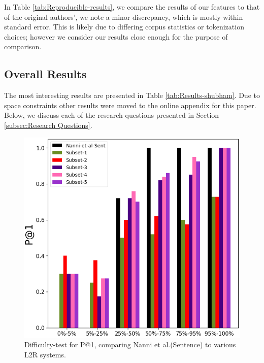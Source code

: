 In Table \ref{tab:Reproducible-results}, we compare the results of our features to that of the original authors', we note a minor discrepancy, which is mostly within standard error. This is likely due to differing corpus statistics or tokenization choices; however we consider our results close enough for the purpose of comparison. 


\subsection{Overall Results}
\label{subsec:Results}
The most interesting results are presented in Table \ref{tab:Results-shubham}. Due to space constraints other results were moved to the online appendix for this paper. Below, we discuss each of the research questions presented in Section \ref{subsec:Research Questions}.


\begin{figure}[t]
    \centering
    \includegraphics [width=1\columnwidth]{plot-cropped.png}
    \caption{Difficulty-test for P@1, comparing Nanni et al.(Sentence) to various L2R systems.}
    \label{fig:difficulty-plot}
\end{figure}

